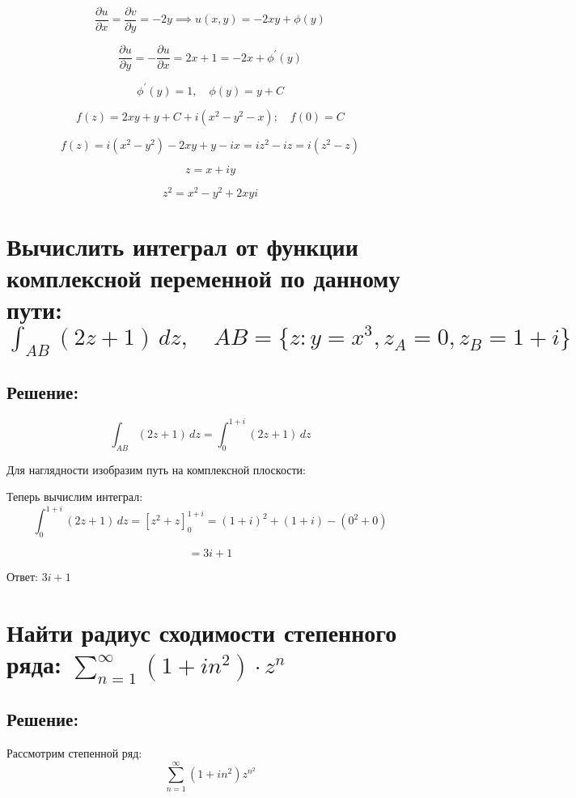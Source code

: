 \documentclass{article}
\begin{document}
\[
\frac{\partial u}{\partial x} = \frac{\partial v}{\partial y}= -2y \implies u(x,y) = -2xy + \phi(y)
\]

\[
\frac{\partial u}{\partial y} = - \frac{\partial u}{\partial x}  = 2x + 1 = -2x + \phi^{'}(y) 
\]

\[
\phi^{'}(y) = 1, \quad \phi(y) = y + C
\]


\[
f(z) = 2xy + y + C + i(x^2 - y^2 - x); \quad f(0) = C
\]

\[
f(z) = i(x^2 - y^2) - 2xy + y - ix = iz^2 - iz = i(z^2 - z)
\]

\[
z = x + iy
\]

\[
z^2 = x^2 - y^2 + 2xyi
\]


\section{Вычислить интеграл от функции комплексной переменной по данному пути: $\int_{AB} (2z + 1) \, dz, \quad AB = \{z : y = x^3, z_A = 0, z_B = 1 + i\}$}
\subsection{Решение:}
\[
\int_{AB} (2z + 1) \, dz = \int_{0}^{1+i} (2z + 1) \, dz
\]

Для наглядности изобразим путь на комплексной плоскости:

Теперь вычислим интеграл:
\[
\int_{0}^{1+i} (2z + 1) \, dz = \left[ z^2 + z \right]_{0}^{1+i} = (1+i)^2 + (1+i) - (0^2 + 0)
\]

\[
= 3i + 1
\]

Ответ: $3i + 1$

\section{Найти радиус сходимости степенного ряда: $\sum_{n=1}^{\infty} (1 + in^2) \cdot z^n$}
\subsection{Решение:}

Рассмотрим степенной ряд:
\[
\sum_{n=1}^{\infty} (1 + in^2) z^{n^2}
\]
\end{document}
